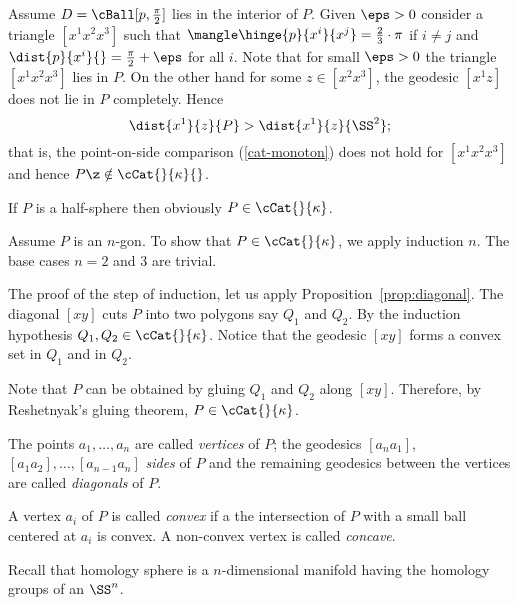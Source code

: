 Assume $D=\cBall[p,\tfrac{\pi}2]$ lies in  the interior of $P$.
Given $\eps>0$
consider a triangle $[x^1x^2x^3]$ 
such that $\mangle\hinge{p}{x^i}{x^j}=\tfrac23\cdot\pi$ if $i\ne j$
and 
$\dist{p}{x^i}{}=\tfrac{\pi}2+\eps$ for all $i$.
Note that for small $\eps>0$ the triangle $ [x^1x^2x^3]$ lies in $P$.
On the other hand for some $z\in[x^2x^3]$, the geodesic $[x^1z]$ does not lie in $P$ completely.
Hence 
\[\dist{x^1}{z}{P}>\dist{x^1}{z}{\SS^2};\]
that is, the point-on-side comparison (\ref{cat-monoton}) does not hold for $[x^1x^2x^3]$
and hence $P\z\notin \cCat{}{\kappa}{}$.

If $P$ is a half-sphere then obviously $P\in\cCat{}{\kappa}$.

Assume $P$ is an $n$-gon.
To show that $P\in\cCat{}{\kappa}$,
we apply induction $n$.
The base cases $n=2$ and $3$ are trivial.

The proof of the step of induction,
let us apply Proposition~\ref{prop:diagonal}.
The diagonal $[xy]$ cuts $P$ into two polygons say $Q_1$ and $Q_2$.
By the induction hypothesis $Q_1,Q_2\in\cCat{}{\kappa}$.
Notice that the geodesic $[xy]$ forms a convex set
in $Q_1$ and in $Q_2$.

Note that $P$ can be obtained by gluing $Q_1$ and $Q_2$ along $[xy]$.
Therefore, by Reshetnyak's gluing theorem,
$P\in\cCat{}{\kappa}$.
\qeds













The points $a_1,\dots,a_n$ 
are called \emph{vertices} of $P$;
the geodesics $[a_na_1]$, $[a_1a_2],\dots,[a_{n-1}a_n]$ 
\emph{sides} of $P$
and the remaining geodesics between the vertices are called \emph{diagonals} of $P$.

A vertex $a_i$ of $P$ 
is called \emph{convex} if a the intersection of $P$ with a small ball centered at $a_i$ is convex.
A non-convex vertex is called \emph{concave}.















Recall that homology sphere is a $n$-dimensional manifold having the homology groups of an $\SS^n$. 

